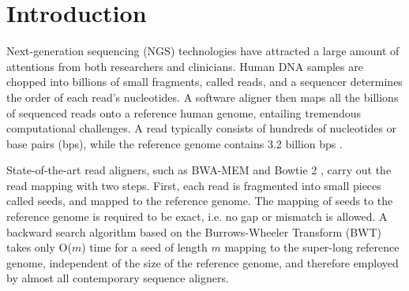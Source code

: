 \section{Introduction} 
\label{sec:introduction}

Next-generation sequencing (NGS) technologies have attracted a large amount of attentions from both researchers and clinicians. 
Human DNA samples are chopped into billions of small fragments, called reads, and a sequencer determines the order of each read's nucleotides. 
A software aligner then maps all the billions of sequenced reads onto a reference human genome, entailing tremendous computational challenges.
A read typically consists of hundreds of nucleotides or base pairs (bps), while the reference genome contains 3.2 billion bps \cite{Mardis2008}.

State-of-the-art read aligners, such as BWA-MEM \cite{BWA-MEM} and Bowtie 2 \cite{Bowtie}\cite{Bowtie2}, 
carry out the read mapping with two steps. 
First, each read is fragmented into small pieces called seeds, and mapped to the reference genome. 
The mapping of seeds to the reference genome is required to be exact, i.e. no gap or mismatch is allowed. 
A backward search algorithm based on the Burrows-Wheeler Transform (BWT) \cite{BWT} takes only O($m$) time for a seed of length $m$ mapping to the super-long reference genome, independent of the size of the reference genome, and therefore employed by almost all contemporary sequence aligners.

